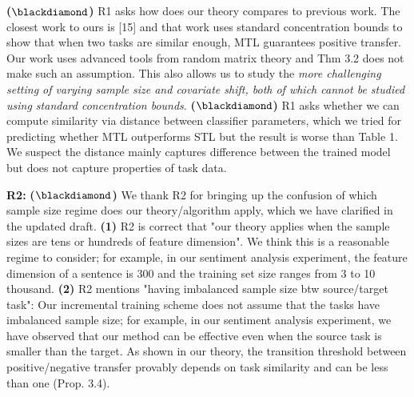 \documentclass{article}
\begin{document}
\vspace{-0.045in}
\textbf{($\blackdiamond$)} R1 asks how does our theory compares to previous work. The closest work to ours is [15] and that work uses standard concentration bounds to show that when two tasks are similar enough, MTL guarantees positive transfer.
Our work uses advanced tools from random matrix theory and Thm 3.2 does not make such an assumption.
This also allows us to study the \textit{more challenging setting of varying sample size and covariate shift, both of which cannot be studied using standard concentration bounds}.
\textbf{($\blackdiamond$)} R1 asks whether we can compute similarity via distance between classifier parameters,
which we tried for predicting whether MTL outperforms STL but the result is worse than Table 1.
We suspect the distance mainly captures difference between the trained model but does not capture properties of task data.
%

\vspace{-0.025in}
\textbf{R2:}
\textbf{($\blackdiamond$)} We thank R2 for bringing up the confusion of which sample size regime does our theory/algorithm apply, which we have clarified in the updated draft.
\textbf{(1)} R2 is correct that "our theory applies when the sample sizes are tens or hundreds of feature dimension".
We think this is a reasonable regime to consider; for example, in our sentiment analysis experiment, the feature dimension of a sentence is 300 and the training set size ranges from 3 to 10 thousand.
\textbf{(2)} R2 mentions "having imbalanced sample size btw source/target task": Our incremental training scheme does not assume that the tasks have imbalanced sample size; for example, in our sentiment analysis experiment, we have observed that our method can be effective even when the source task is smaller than the target.
As shown in our theory, the transition threshold between positive/negative transfer provably depends on task similarity and can be less than one (Prop. 3.4).
\end{document}
